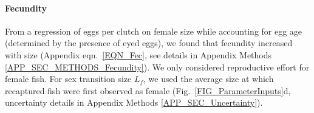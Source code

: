 \documentclass[12pt, oneside]{article}   	%
\begin{document}
\paragraph*{Fecundity}

From a regression of eggs per clutch on female size while accounting for egg age (determined by the presence of eyed eggs), we found that fecundity increased with size (Appendix eqn.\ \ref{EQN_Fec}, see details in Appendix Methods \ref{APP_SEC_METHODS_Fecundity}). We only considered reproductive effort for female fish. For sex transition size $L_f$, we used the average size at which recaptured fish were first observed as female (Fig.\ \ref{FIG_ParameterInputs}d, uncertainty details in Appendix Methods \ref{APP_SEC_Uncertainty}).





\end{document}
